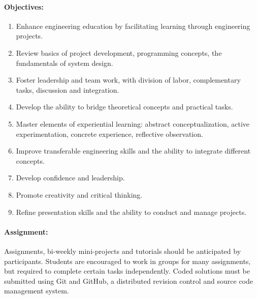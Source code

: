 \documentclass[letterpaper,11pt]{article}
\begin{document}
\paragraph{Objectives:}
\begin{enumerate}
\topsep0.3ex plus 0.2ex
\parsep0.2ex plus 0.2ex
0em
1em
\itemindent0em
\leftmargin{}
{}
\itemsep0ex
\listparindent0em
\item
Enhance engineering education by facilitating learning through engineering projects.

\item
Review basics of project development, programming concepts, the fundamentals of system design.

\item
Foster leadership and team work, with division of labor, complementary tasks, discussion and integration.

\item
Develop the ability to bridge theoretical concepts and practical tasks.

\item
Master elements of experiential learning: abstract conceptualization, active experimentation, concrete experience, reflective observation.

\item
Improve transferable engineering skills and the ability to integrate different concepts.

\item
Develop confidence and leadership.

\item
Promote creativity and critical thinking.

\item
Refine presentation skills and the ability to conduct and manage projects.
\end{enumerate}

\paragraph{Assignment:}
Assignments, bi-weekly mini-projects and tutorials should be anticipated by participants.
Students are encouraged to work in groups for many assignments, but required to complete certain tasks independently.
Coded solutions must be submitted using Git and GitHub, a distributed revision control and source code management system.
\end{document}
